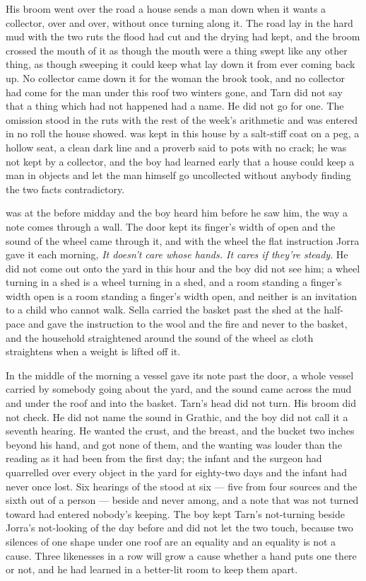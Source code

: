 His broom went over the road a house sends a man down when it wants a collector, over and over, without once turning along it. The road lay in the hard mud with the two ruts the flood had cut and the drying had kept, and the broom crossed the mouth of it as though the mouth were a thing swept like any other thing, as though sweeping it could keep what lay down it from ever coming back up. No collector came down it for the woman the brook took, and no collector had come for the man under this roof two winters gone, and Tarn did not say that a thing which had not happened had a name. He did not go for one. The omission stood in the ruts with the rest of the week's arithmetic and was entered in no roll the house showed.  was kept in this house by a salt-stiff coat on a peg, a hollow seat, a clean dark line and a proverb said to pots with no crack; he was not kept by a collector, and the boy had learned early that a house could keep a man in objects and let the man himself go uncollected without anybody finding the two facts contradictory.

\scenebreak

 was at the  before midday and the boy heard him before he saw him, the way a note comes through a wall. The door kept its finger's width of open and the sound of the wheel came through it, and with the wheel the flat instruction Jorra gave it each morning, \emph{It doesn't care whose hands. It cares if they're steady}. He did not come out onto the yard in this hour and the boy did not see him; a wheel turning in a shed is a wheel turning in a shed, and a room standing a finger's width open is a room standing a finger's width open, and neither is an invitation to a child who cannot walk. Sella carried the basket past the shed at the half-pace and gave the instruction to the wool and the fire and never to the basket, and the household straightened around the sound of the wheel as cloth straightens when a weight is lifted off it.

In the middle of the morning a vessel gave its note past the door, a whole vessel carried by somebody going about the yard, and the sound came across the mud and under the roof and into the basket. Tarn's head did not turn. His broom did not check. He did not name the sound in Grathic, and the boy did not call it a seventh hearing. He wanted the crust, and the breast, and the bucket two inches beyond his hand, and got none of them, and the wanting was louder than the reading as it had been from the first day; the infant and the surgeon had quarrelled over every object in the yard for eighty-two days and the infant had never once lost. Six hearings of the  stood at six --- five from four sources and the sixth out of a person --- beside and never among, and a note that was not turned toward had entered nobody's keeping. The boy kept Tarn's not-turning beside Jorra's not-looking of the day before and did not let the two touch, because two silences of one shape under one roof are an equality and an equality is not a cause. Three likenesses in a row will grow a cause whether a hand puts one there or not, and he had learned in a better-lit room to keep them apart.

